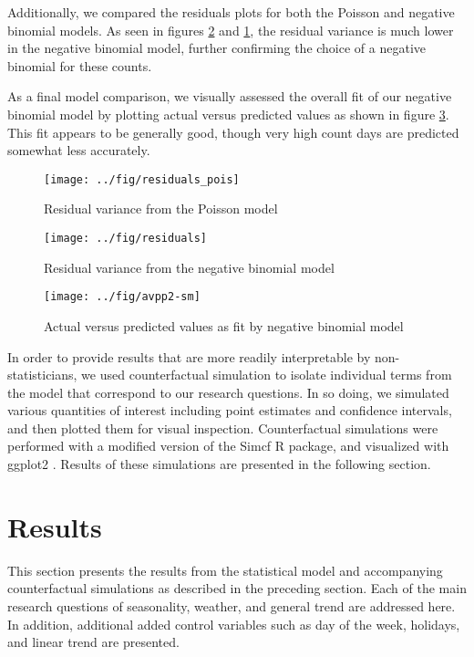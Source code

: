 \documentclass[12pt,letterpaper,article,twocolumn]{memoir}
\begin{document}
Additionally, we compared the residuals plots for both the Poisson and
negative binomial models. As seen in figures \ref{fg:resnb} and
\ref{fg:respois}, the residual variance is much lower in the negative
binomial model, further confirming the choice of a negative
binomial for these counts.

As a final model comparison, we visually assessed the overall fit of
our negative binomial model by plotting actual versus predicted values
as shown in figure \ref{fg:avp}. This fit appears to be generally
good, though very high count days are predicted somewhat less
accurately.

\begin{figure}[h!]
  \centering
  \texttt{[image: ../fig/residuals\_pois]}
  \caption{Residual variance from the Poisson model}
  \label{fg:respois}
\end{figure}

\begin{figure}[h!]
  \centering
  \texttt{[image: ../fig/residuals]}
  \caption{Residual variance from the negative binomial model}
  \label{fg:resnb}
\end{figure}

\begin{figure}[h!]
  \centering
  \texttt{[image: ../fig/avpp2-sm]}
  \caption{Actual versus predicted values as fit by negative binomial model}
  \label{fg:avp}
\end{figure}

In order to provide results that are more readily interpretable by
non-statisticians, we used counterfactual simulation to isolate
individual terms from the model that correspond to our research
questions. In so doing, we simulated various quantities of interest
including point estimates and confidence intervals, and then plotted
them for visual inspection. Counterfactual simulations were performed
with a modified version of the Simcf R package, and visualized with
ggplot2 \parencite{Adolph:2014aa,Schmiedeskamp:aa,Wickham:2009aa}.
Results of these simulations are presented in the following section.

\section*{Results}
% 
% 
This section presents the results from the statistical model and
accompanying counterfactual simulations as described in the preceding
section. Each of the main research questions of seasonality, weather,
and general trend are addressed here. In addition, additional added
control variables such as day of the week, holidays, and linear trend
are presented.
\end{document}
